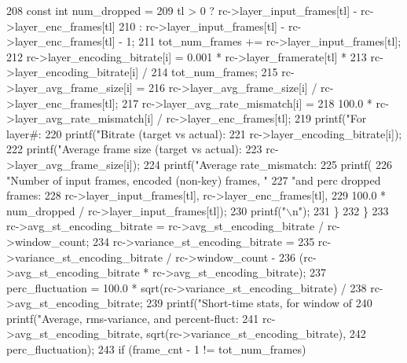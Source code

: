 \begin{DoxyCodeInclude}
{{208       \textcolor{keyword}{const} \textcolor{keywordtype}{int} num\_dropped =
209           tl > 0 ? rc->layer\_input\_frames[tl] - rc->layer\_enc\_frames[tl]
210                  : rc->layer\_input\_frames[tl] - rc->layer\_enc\_frames[tl] - 1;
211       tot\_num\_frames += rc->layer\_input\_frames[tl];
212       rc->layer\_encoding\_bitrate[i] = 0.001 * rc->layer\_framerate[tl] *
213                                       rc->layer\_encoding\_bitrate[i] /
214                                       tot\_num\_frames;
215       rc->layer\_avg\_frame\_size[i] =
216           rc->layer\_avg\_frame\_size[i] / rc->layer\_enc\_frames[tl];
217       rc->layer\_avg\_rate\_mismatch[i] =
218           100.0 * rc->layer\_avg\_rate\_mismatch[i] / rc->layer\_enc\_frames[tl];
219       printf(\textcolor{stringliteral}{"For layer#: %
220       printf(\textcolor{stringliteral}{"Bitrate (target vs actual): %
221              rc->layer\_encoding\_bitrate[i]);
222       printf(\textcolor{stringliteral}{"Average frame size (target vs actual): %
223              rc->layer\_avg\_frame\_size[i]);
224       printf(\textcolor{stringliteral}{"Average rate\_mismatch: %
225       printf(
226           \textcolor{stringliteral}{"Number of input frames, encoded (non-key) frames, "}
227           \textcolor{stringliteral}{"and perc dropped frames: %
228           rc->layer\_input\_frames[tl], rc->layer\_enc\_frames[tl],
229           100.0 * num\_dropped / rc->layer\_input\_frames[tl]);
230       printf(\textcolor{stringliteral}{"\(\backslash\)n"});
231     \}
232   \}
233   rc->avg\_st\_encoding\_bitrate = rc->avg\_st\_encoding\_bitrate / rc->window\_count;
234   rc->variance\_st\_encoding\_bitrate =
235       rc->variance\_st\_encoding\_bitrate / rc->window\_count -
236       (rc->avg\_st\_encoding\_bitrate * rc->avg\_st\_encoding\_bitrate);
237   perc\_fluctuation = 100.0 * sqrt(rc->variance\_st\_encoding\_bitrate) /
238                      rc->avg\_st\_encoding\_bitrate;
239   printf(\textcolor{stringliteral}{"Short-time stats, for window of %
240   printf(\textcolor{stringliteral}{"Average, rms-variance, and percent-fluct: %
241          rc->avg\_st\_encoding\_bitrate, sqrt(rc->variance\_st\_encoding\_bitrate),
242          perc\_fluctuation);
243   \textcolor{keywordflow}{if} (frame\_cnt - 1 != tot\_num\_frames)
}}}}}}}}}
\end{DoxyCodeInclude}
